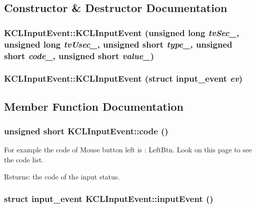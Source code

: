 \subsection{Constructor \& Destructor Documentation}
\hypertarget{class_k_c_l_input_event_c63424ab23ee29d723f5d1c7be5fc611}{
\subsubsection[{KCLInputEvent}]{\setlength{\rightskip}{0pt plus 5cm}KCLInputEvent::KCLInputEvent (unsigned long {\em tvSec\_\-}, \/  unsigned long {\em tvUsec\_\-}, \/  unsigned short {\em type\_\-}, \/  unsigned short {\em code\_\-}, \/  unsigned short {\em value\_\-})}}
\label{class_k_c_l_input_event_c63424ab23ee29d723f5d1c7be5fc611}


\hypertarget{class_k_c_l_input_event_6bfdec36c4b9f11bf6146041a42ed38a}{
\subsubsection[{KCLInputEvent}]{\setlength{\rightskip}{0pt plus 5cm}KCLInputEvent::KCLInputEvent (struct input\_\-event {\em ev})}}
\label{class_k_c_l_input_event_6bfdec36c4b9f11bf6146041a42ed38a}




\subsection{Member Function Documentation}
\hypertarget{class_k_c_l_input_event_5221441a9d80302c2c78bbed623b7456}{
\subsubsection[{code}]{\setlength{\rightskip}{0pt plus 5cm}unsigned short KCLInputEvent::code ()}}
\label{class_k_c_l_input_event_5221441a9d80302c2c78bbed623b7456}


For example the code of Mouse button left is : LeftBtn. Look on this page to see the code list. \begin{Desc}
\item[Returns:]the code of the input status. \end{Desc}
\hypertarget{class_k_c_l_input_event_de2a9323ac2ac739fcb27a3b361fb776}{
\subsubsection[{inputEvent}]{\setlength{\rightskip}{0pt plus 5cm}struct input\_\-event KCLInputEvent::inputEvent ()}}
\label{class_k_c_l_input_event_de2a9323ac2ac739fcb27a3b361fb776}


